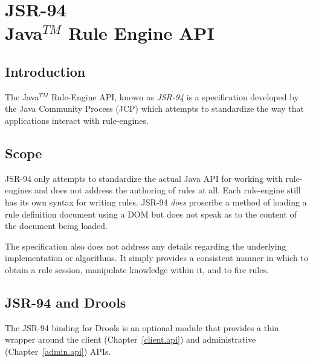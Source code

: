 \chapter[JSR-94 : Java$^{TM}$ Rule-Engine API]{JSR-94\\\huge Java$^{TM}$ Rule Engine API}

\section{Introduction}

The Java$^{TM}$ Rule-Engine API, known as \emph{JSR-94} is a
specification developed by the Java Community Process (JCP)
which attempts to standardize the way that applications interact
with rule-engines.

\section{Scope}

JSR-94 only attempts to standardize the actual Java API for working
with rule-engines and does not address the authoring of rules at all.
Each rule-engine still has its own syntax for writing rules.  JSR-94
\emph{does} proscribe a method of loading a rule definition document
using a DOM  but does not speak as to the
content of the document being loaded.

The specification also does not address any details regarding the
underlying implementation or algorithms.  It simply provides a
consistent manner in which to obtain a rule session, manipulate
knowledge within it, and to fire rules.

\section{JSR-94 and Drools}

The JSR-94 binding for Drools is an optional module that provides a
thin wrapper around the client (Chapter~\vref{client.api}) and
administrative (Chapter~\vref{admin.api}) APIs.

